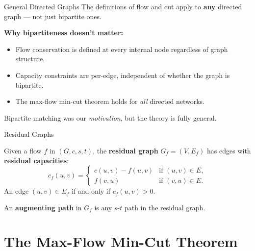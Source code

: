 \documentclass[aspectratio=169]{beamer}
\begin{document}
\begin{frame}{General Directed Graphs}
  The definitions of flow and cut apply to \textbf{any} directed graph --- not
  just bipartite ones.

  \vspace{1em}
  \textbf{Why bipartiteness doesn't matter:}
  \begin{itemize}
    \item Flow conservation is defined at every internal node regardless of
          graph structure.
    \item Capacity constraints are per-edge, independent of whether the graph
          is bipartite.
    \item The max-flow min-cut theorem holds for \emph{all} directed networks.
  \end{itemize}

  \vspace{1em}
  Bipartite matching was our \emph{motivation}, but the theory is fully general.
\end{frame}

\begin{frame}{Residual Graphs}
  \begin{definition}
    Given a flow $f$ in $(G, c, s, t)$, the \textbf{residual graph}
    $G_f = (V, E_f)$ has edges with \textbf{residual capacities}:
    \[
      c_f(u,v) =
      \begin{cases}
        c(u,v) - f(u,v) & \text{if } (u,v) \in E, \\
        f(v,u)           & \text{if } (v,u) \in E.
      \end{cases}
    \]
    An edge $(u,v) \in E_f$ if and only if $c_f(u,v) > 0$.
  \end{definition}

  \vspace{0.5em}
  An \textbf{augmenting path} in $G_f$ is any $s$-$t$ path in the residual
  graph.
\end{frame}

\section{The Max-Flow Min-Cut Theorem}
\end{document}
